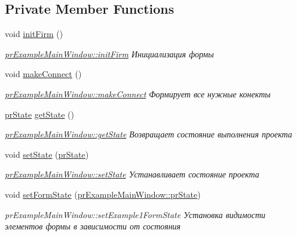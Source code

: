 \subsection*{Private Member Functions}
\begin{DoxyCompactItemize}
\item 
void \hyperlink{classpr_example_main_window_a4101c3f2b8ee5c1a33b3efc303993b7e}{init\+Firm} ()
\begin{DoxyCompactList}\small\item\em \hyperlink{classpr_example_main_window_a4101c3f2b8ee5c1a33b3efc303993b7e}{pr\+Example\+Main\+Window\+::init\+Firm} Инициализация формы \end{DoxyCompactList}\item 
void \hyperlink{classpr_example_main_window_a05eb7e290281288b56ac087490bcd191}{make\+Connect} ()
\begin{DoxyCompactList}\small\item\em \hyperlink{classpr_example_main_window_a05eb7e290281288b56ac087490bcd191}{pr\+Example\+Main\+Window\+::make\+Connect} Формирует все нужные конекты \end{DoxyCompactList}\item 
\hyperlink{classpr_example_main_window_ac6ea07691b05604b1dda8ec6263c028c}{pr\+State} \hyperlink{classpr_example_main_window_accee9261c93ec98afa66d5e51642a34e}{get\+State} ()
\begin{DoxyCompactList}\small\item\em \hyperlink{classpr_example_main_window_accee9261c93ec98afa66d5e51642a34e}{pr\+Example\+Main\+Window\+::get\+State} Возвращает состояние выполнения проекта \end{DoxyCompactList}\item 
void \hyperlink{classpr_example_main_window_a81e478c0b0696290226327898a62b53a}{set\+State} (\hyperlink{classpr_example_main_window_ac6ea07691b05604b1dda8ec6263c028c}{pr\+State})
\begin{DoxyCompactList}\small\item\em \hyperlink{classpr_example_main_window_a81e478c0b0696290226327898a62b53a}{pr\+Example\+Main\+Window\+::set\+State} Устанавливает состояние проекта \end{DoxyCompactList}\item 
void \hyperlink{classpr_example_main_window_abbb7d4ab8838740081570c5c6b2a8f60}{set\+Form\+State} (\hyperlink{classpr_example_main_window_ac6ea07691b05604b1dda8ec6263c028c}{pr\+Example\+Main\+Window\+::pr\+State})
\begin{DoxyCompactList}\small\item\em pr\+Example\+Main\+Window\+::set\+Example1\+Form\+State Установка видимости элементов формы в зависимости от состояния \end{DoxyCompactList}\item 

\end{DoxyCompactItemize}

